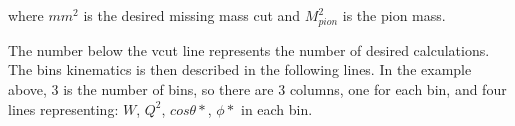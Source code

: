 where $mm^2$ is the desired missing mass cut and $M_{pion}^2$ is the pion mass.

The number below the vcut line represents the number of desired calculations.
The bins kinematics is then described in the following lines. In the example above, $3$ is the number of bins,
so there are 3 columns, one for each bin, and four lines representing: $W$, $Q^2$, $cos\theta*$, $\phi*$ in each bin.









